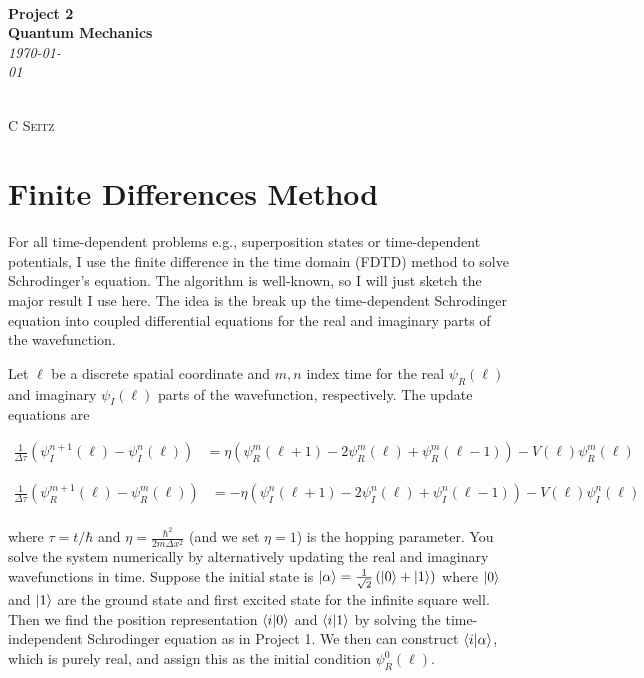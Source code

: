 \documentclass[12pt]{article}
\theoremstyle{definition}
\begin{document}
 {\noindent\Huge\bf  \\[0.5\baselineskip] {\selectfont  Project 2}         }\\[2\baselineskip] %
{ {\bf {}\selectfont Quantum Mechanics}\\ {\textit{\selectfont     \today}}}~~~~~~~~~~~~~~~~~~~~~~~~~~~~~~~~~~~~~~~~~~~~~~~~~~~~~~~~~~~~~~~~~~~~~~~~~~~~~    
{\large \textsc{C Seitz}
\\[1.4\baselineskip] 

\section{Finite Differences Method}

For all time-dependent problems e.g., superposition states or time-dependent potentials, I use the finite difference in the time domain (FDTD) method to solve Schrodinger's equation. The algorithm is well-known, so I will just sketch the major result I use here. The idea is the break up the time-dependent Schrodinger equation into coupled differential equations for the real and imaginary parts of the wavefunction. 

Let $\ell$ be a discrete spatial coordinate and $m,n$ index time for the real $\psi_{R}(\ell)$ and imaginary $\psi_{I}(\ell)$ parts of the wavefunction, respectively. The update equations are

\begin{align*}
\frac{1}{\Delta \tau}\left(\psi_{I}^{n+1}(\ell)-\psi_{I}^{n}(\ell)\right) &= \eta\left(\psi_{R}^{m}(\ell + 1) - 2\psi_{R}^{m}(\ell)+ \psi_{R}^{m}(\ell -1 )\right) - V(\ell)\psi_{R}^{m}(\ell)
\end{align*}

\begin{align*}
\frac{1}{\Delta \tau}\left(\psi_{R}^{m+1}(\ell)-\psi_{R}^{m}(\ell)\right) &= -\eta\left(\psi_{I}^{n}(\ell + 1) - 2\psi_{I}^{n}(\ell)+ \psi_{I}^{n}(\ell -1 )\right) - V(\ell)\psi_{I}^{n}(\ell)\\
\end{align*}

where $\tau = t/\hbar$ and $\eta = \frac{\hbar^{2}}{2m\Delta x^{2}}$ (and we set $\eta=1$) is the hopping parameter. You solve the system numerically by alternatively updating the real and imaginary wavefunctions in time. Suppose the initial state is $\ket{\alpha} = \frac{1}{\sqrt{2}}\left(\ket{0} + \ket{1}\right)$ where $\ket{0}$ and $\ket{1}$ are the ground state and first excited state for the infinite square well. Then we find the position representation $\bra{i}\ket{0}$ and $\bra{i}\ket{1}$ by solving the time-independent Schrodinger equation as in Project 1. We then can construct $\bra{i}\ket{\alpha}$, which is purely real, and assign this as the initial condition $\psi_{R}^{0}(\ell)$.

}
\end{document}
